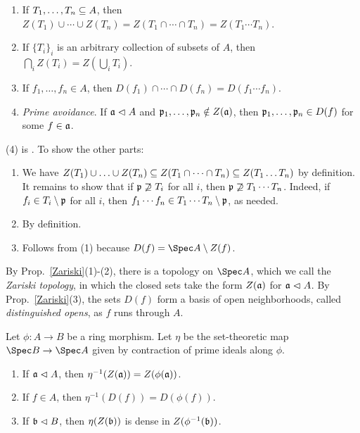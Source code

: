 \documentclass[10pt,final,oneside]{amsbook}
\makeatletter
\renewenvironment{proof}[1][\proofname] 
{ 	
	\par\pushQED{\qed}\normalfont\topsep6\p@\@plus6\p@\relax\trivlist\itemindent\normalparindent
	\item[\hskip\labelsep\itshape#1\@addpunct{.}]\ignorespaces
}
{
	\popQED\endtrivlist\@endpefalse
}
\numberwithin{equation}{section}
\makeatother
\begin{document}
\begin{prop}\label{Zariski}\mbox{}
\begin{enumerate}
\item 	If $T_1, \ldots, T_n \subseteq A$, then $Z(T_1) \cup \cdots \cup Z(T_n) = Z(T_1 \cap \cdots \cap T_n) = Z(T_1 \cdots T_n)$.
\item 	If $\{T_i\}_i$ is an arbitrary collection of subsets of $A$, then $\bigcap_i Z(T_i) = Z(\bigcup_i T_i)$.
\item 	If $f_1, \ldots, f_n \in A$, then $D(f_1) \cap \cdots \cap D(f_n) = D(f_1\cdots f_n)$.
\item 	\emph{Prime avoidance}.
			If $\mathfrak{a} \vartriangleleft A$ and $\mathfrak{p}_1, \ldots, \mathfrak{p}_n \notin Z(\mathfrak{a})$, then $\mathfrak{p}_1, \ldots, \mathfrak{p}_n \in D(f)$ for some $f \in \mathfrak{a}$.
\end{enumerate}
\end{prop}

\begin{proof}
(4) is \cite[Prop.~1.11(1)]{AM}.
To show the other parts:
\begin{enumerate}
\item 	We have $Z(T_1) \cup \ldots \cup Z(T_n) \subseteq Z(T_1 \cap \cdots \cap T_n) \subseteq  Z(T_1 \ldots T_n)$ by definition.
			It remains to show that if $\mathfrak{p} \not\supseteq T_i$ for all $i$, then $\mathfrak{p} \not\supseteq T_1\cdots T_n$.
			Indeed, if $f_i \in T_i \setminus \mathfrak{p}$ for all $i$, then $f_1 \cdots f_n \in T_1\cdots T_n \setminus \mathfrak{p}$, as needed.
\item 	By definition.
\item 	Follows from (1) because $D(f) = \Spec A \setminus Z(f)$.\qedhere
\end{enumerate}
\end{proof}

By Prop.~\ref{Zariski}(1)-(2), there is a topology on $\Spec A$, which we call the \emph{Zariski topology}, in which the closed sets take the form $Z(\mathfrak{a})$ for $\mathfrak{a} \vartriangleleft A$. By Prop.~\ref{Zariski}(3), the sets $D(f)$ form a basis of open neighborhoods, called \emph{distinguished opens}, as $f$ runs through $A$.

\begin{prop}\label{Contraction}
Let $\phi : A \to B$ be a ring morphism.
Let $\eta$ be the set-theoretic map $\Spec B \to \Spec A$ given by contraction of prime ideals along $\phi$.
\begin{enumerate}
\item 	If $\mathfrak{a} \vartriangleleft A$, then $\eta^{-1}(Z(\mathfrak{a})) = Z(\phi(\mathfrak{a}))$.
\item 	If $f \in A$, then $\eta^{-1}(D(f)) = D(\phi(f))$.
\item 	If $\mathfrak{b} \vartriangleleft B$, then $\eta(Z(\mathfrak{b}))$ is dense in $Z(\phi^{-1}(\mathfrak{b}))$.
\end{enumerate}
\end{prop}
\end{document}
